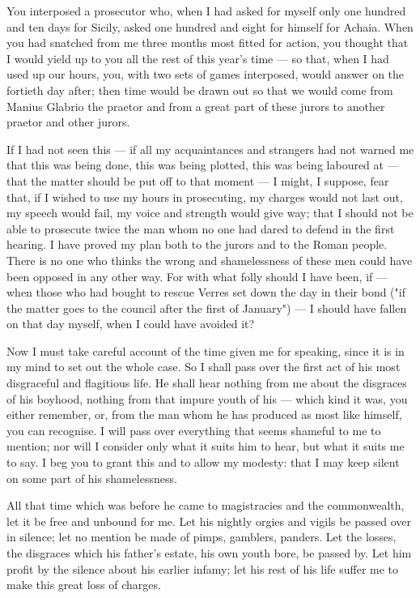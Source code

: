  You interposed a prosecutor who, when I had asked for myself only one hundred and ten days for Sicily, asked one hundred and eight for himself for Achaia. When you had snatched from me three months most fitted for action, you thought that I would yield up to you all the rest of this year's time --- so that, when I had used up our hours, you, with two sets of games interposed, would answer on the fortieth day after; then time would be drawn out so that we would come from Manius Glabrio the praetor and from a great part of these jurors to another praetor and other jurors.

 If I had not seen this --- if all my acquaintances and strangers had not warned me that this was being done, this was being plotted, this was being laboured at --- that the matter should be put off to that moment --- I might, I suppose, fear that, if I wished to use my hours in prosecuting, my charges would not last out, my speech would fail, my voice and strength would give way; that I should not be able to prosecute twice the man whom no one had dared to defend in the first hearing. I have proved my plan both to the jurors and to the Roman people. There is no one who thinks the wrong and shamelessness of these men could have been opposed in any other way. For with what folly should I have been, if --- when those who had bought to rescue Verres set down the day in their bond ("if the matter goes to the council after the first of January") --- I should have fallen on that day myself, when I could have avoided it?

 Now I must take careful account of the time given me for speaking, since it is in my mind to set out the whole case. So I shall pass over the first act of his most disgraceful and flagitious life. He shall hear nothing from me about the disgraces of his boyhood, nothing from that impure youth of his --- which kind it was, you either remember, or, from the man whom he has produced as most like himself, you can recognise. I will pass over everything that seems shameful to me to mention; nor will I consider only what it suits him to hear, but what it suits me to say. I beg you to grant this and to allow my modesty: that I may keep silent on some part of his shamelessness.

 All that time which was before he came to magistracies and the commonwealth, let it be free and unbound for me. Let his nightly orgies and vigils be passed over in silence; let no mention be made of pimps, gamblers, panders. Let the losses, the disgraces which his father's estate, his own youth bore, be passed by. Let him profit by the silence about his earlier infamy; let his rest of his life suffer me to make this great loss of charges.

